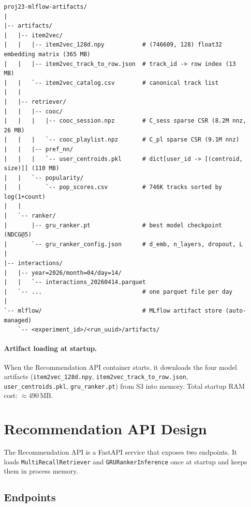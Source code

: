 \documentclass[11pt]{article}
\begin{document}
\begin{lstlisting}
proj23-mlflow-artifacts/
|
|-- artifacts/
|   |-- item2vec/
|   |   |-- item2vec_128d.npy           # (746609, 128) float32 embedding matrix (365 MB)
|   |   |-- item2vec_track_to_row.json  # track_id -> row index (13 MB)
|   |   `-- item2vec_catalog.csv        # canonical track list
|   |
|   |-- retriever/
|   |   |-- cooc/
|   |   |   |-- cooc_session.npz        # C_sess sparse CSR (8.2M nnz, 26 MB)
|   |   |   `-- cooc_playlist.npz       # C_pl sparse CSR (9.1M nnz)
|   |   |-- pref_nn/
|   |   |   `-- user_centroids.pkl      # dict[user_id -> [(centroid, size)]] (110 MB)
|   |   `-- popularity/
|   |       `-- pop_scores.csv          # 746K tracks sorted by log(1+count)
|   |
|   `-- ranker/
|       |-- gru_ranker.pt               # best model checkpoint (NDCG@5)
|       `-- gru_ranker_config.json      # d_emb, n_layers, dropout, L
|
|-- interactions/
|   |-- year=2026/month=04/day=14/
|   |   `-- interactions_20260414.parquet
|   `-- ...                             # one parquet file per day
|
`-- mlflow/                             # MLflow artifact store (auto-managed)
    `-- <experiment_id>/<run_uuid>/artifacts/
\end{lstlisting}

\paragraph{Artifact loading at startup.}
When the Recommendation API container starts, it downloads the four model artifacts
(\texttt{item2vec\_128d.npy}, \texttt{item2vec\_track\_to\_row.json},
\texttt{user\_centroids.pkl}, \texttt{gru\_ranker.pt}) from S3 into memory.
Total startup RAM cost: $\approx 490\,\text{MB}$.

\section{Recommendation API Design}

The Recommendation API is a FastAPI service that exposes two endpoints.  It loads
\texttt{MultiRecallRetriever} and \texttt{GRURankerInference} once at startup and
keeps them in process memory.

\subsection{Endpoints}
\end{document}
